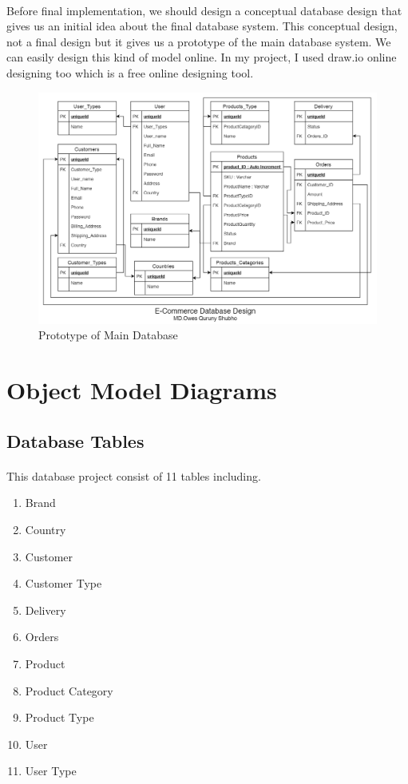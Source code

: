 \documentclass{article}
\begin{document}
	\paragraph{}
		Before final implementation, we should design a conceptual database design that gives us an initial idea about the final database system. This conceptual design, not a final design but it gives us a prototype of the main database system. We can easily design this kind of model online. In my project, I used draw.io online designing too which is a free online designing tool.\\
		\begin{figure}[!h]
			\centering
			\includegraphics[width=5in]{images/initial_model.png}
			\caption{Prototype of Main Database}
			\label{fig:label}
		\end{figure}
	\pagebreak
	\section{Object Model Diagrams}
	\subsection{Database Tables}
	\paragraph{}
		This database project consist of 11 tables including.
		\begin{center}
			\begin{enumerate}
				\item	Brand
				\item	Country
				\item	Customer
				\item	Customer Type
				\item	Delivery
				\item	Orders
				\item	Product
				\item	Product Category
				\item	Product Type
				\item	User
				\item	User Type
			\end{enumerate}
		\end{center}
\end{document}
